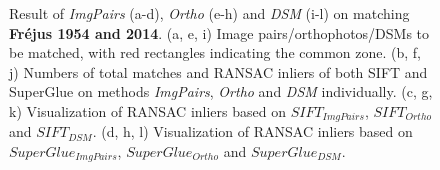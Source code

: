\begin{figure}[htbp]
\begin{center}
{\begin{minipage}[t]{0.48\linewidth}
			\end{minipage}%
		}
		\caption{{\scriptsize Result of \textit{ImgPairs} (a-d), \textit{Ortho} (e-h) and \textit{DSM} (i-l) on matching \textbf{Fr{\'e}jus 1954 and 2014}. (a, e, i) Image pairs/orthophotos/DSMs to be matched, with red rectangles indicating the common zone. (b, f, j) Numbers of total matches and RANSAC inliers of both SIFT and SuperGlue on methods \textit{ImgPairs}, \textit{Ortho} and \textit{DSM} individually. (c, g, k) Visualization of RANSAC inliers based on $SIFT_{ImgPairs}$, $SIFT_{Ortho}$ and $SIFT_{DSM}$. (d, h, l) Visualization of RANSAC inliers based on $SuperGlue_{ImgPairs}$, $SuperGlue_{Ortho}$ and $SuperGlue_{DSM}$.}}
		\label{MatchVizFrejus1954DSM}
	\end{center}
\end{figure} 



